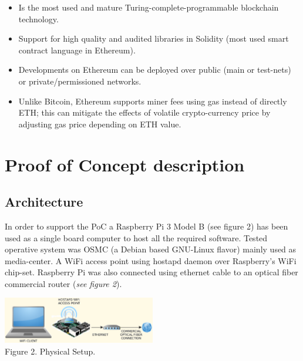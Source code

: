 \documentclass[12pt]{amsart}
\begin{document}
\begin{multicols}{2}
\begin{itemize}
\item Is the most used and mature
Turing-complete-programmable blockchain technology.
\item Support for high quality and audited
libraries in Solidity (most used smart contract language in Ethereum).
\item Developments on Ethereum can be deployed
over public (main or test-nets) or private/permissioned networks.
\item Unlike Bitcoin, Ethereum supports miner fees using gas
instead of directly ETH; this can mitigate the effects of
volatile crypto-currency price by adjusting gas price depending
on ETH value.
\end{itemize}


\section{Proof of Concept description}

\subsection{Architecture}
\label{ch:architecture}
\vspace{0.35cm}

In order to support the PoC a
Raspberry Pi 3 Model B (see figure 2) has been used
as a single board computer to host all the required software.
Tested operative system was OSMC\cite{osmc} (a Debian based
GNU-Linux flavor) mainly used as media-center.
A WiFi access point using
hostapd\cite{hostapd} daemon over Raspberry's WiFi chip-set.
Raspberry Pi was also connected using ethernet cable
to an optical fiber commercial router (\textit{see figure 2}).

\begin{center}
  \includegraphics[keepaspectratio, width=0.5\textwidth]{images/physical-setup-y.eps}
\\
Figure 2. Physical Setup.
\\


\end{center}
\end{multicols}
\end{document}
